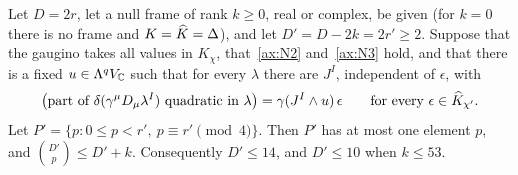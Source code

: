 \begin{theorem}
\label{thm:anysource}
Let $D=2r$, let a null frame of rank $k\ge0$, real or complex, be given (for $k=0$ there is no frame and $K=\widehat{K}=\Delta$), and let $D'=D-2k=2r'\ge2$. Suppose that the gaugino takes all values in $K_\chi$, that~\ref{ax:N2} and~\ref{ax:N3} hold, and that there is a fixed $u\in\Lambda^qV_{\mathbb{C}}$ such that for every $\lambda$ there are $J^I$, independent of $\epsilon$, with
\begin{equation}
\label{eq:anysource}
\bigl(\text{part of }\delta(\gamma^\mu D_\mu\lambda^I)\text{ quadratic in }\lambda\bigr)=\gamma(J^I\wedge u)\,\epsilon\qquad\text{for every }\epsilon\in\widehat{K}_{\chi'} .
\end{equation}
Let $P'=\{p:0\le p<r',\ p\equiv r'\pmod 4\}$. Then $P'$ has at most one element $p$, and $\binom{D'}{p}\le D'+k$. Consequently $D'\le14$, and $D'\le10$ when $k\le53$.
\end{theorem}

